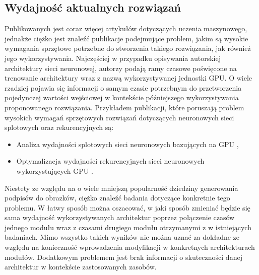 \subsection{Wydajność aktualnych rozwiązań}
Publikowanych jest coraz więcej artykułów dotyczących uczenia maszynowego, jednakże ciężko jest znaleźć publikacje podejmujące problem, jakim są wysokie wymagania sprzętowe potrzebne do stworzenia takiego rozwiązania, jak również jego wykorzystywania. Najczęściej w przypadku opisywania autorskiej architektury sieci neuronowej, autorzy podają ramy czasowe poświęcone na trenowanie architektury wraz z nazwą wykorzystywanej jednostki GPU. O wiele rzadziej pojawia się informacji o samym czasie potrzebnym do przetworzenia pojedynczej wartości wejściowej w kontekście późniejszego wykorzystywania proponowanego rozwiązania.
Przykładem publikacji, które poruszają problem wysokich wymagań sprzętowych rozwiązań dotyczących neuronowych sieci splotowych oraz rekurencyjnych są:
\begin{itemize}
  \item Analiza wydajności splotowych sieci neuronowych bazujących na GPU \cite{cnn-compare},
  \item Optymalizacja wydajności rekurencyjnych sieci neuronowych wykorzystujących GPU \cite{rnn-compare}.
\end{itemize}
Niestety ze względu na o wiele mniejszą popularność dziedziny generowania podpisów do obrazków, ciężko znaleźć badania dotyczące konkretnie tego problemu. W łatwy sposób można oszacować, w jaki sposób zmieniać będzie się sama wydajność wykorzystywanych architektur poprzez połączenie czasów jednego modułu wraz z czasami drugiego modułu otrzymanymi z w istniejących badaniach. Mimo wszystko takich wyników nie można uznać za dokładne ze względu na konieczność wprowadzenia modyfikacji w konkretnych architekturach modułów. Dodatkowym problemem jest brak informacji o skuteczności danej architektur w kontekście zastosowanych zasobów.

